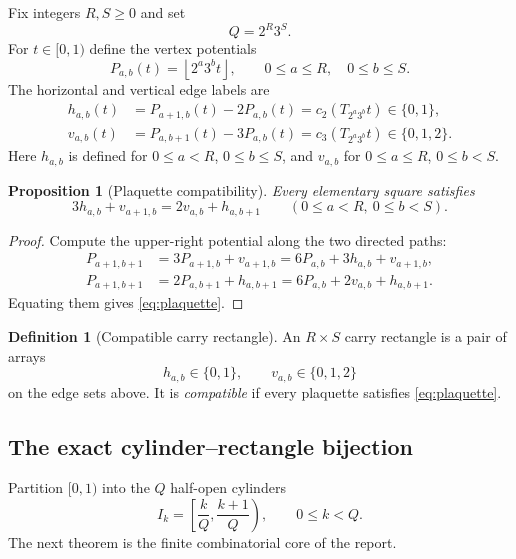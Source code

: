 \documentclass[11pt]{article}
\newtheorem{proposition}[theorem]{Proposition}
\theoremstyle{definition}
\newtheorem{definition}[theorem]{Definition}
\theoremstyle{remark}
\newcommand{\floor}[1]{\left\lfloor#1\right\rfloor}
\begin{document}
Fix integers $R,S\ge0$ and set
\begin{equation}\label{eq:Q-smooth}
 Q=2^R3^S.
\end{equation}
For $t\in[0,1)$ define the vertex potentials
\begin{equation}\label{eq:vertex-potential}
 P_{a,b}(t)=\floor{2^a3^b t},
 \qquad 0\le a\le R,
 \quad 0\le b\le S.
\end{equation}
The horizontal and vertical edge labels are
\begin{align}
 h_{a,b}(t)
 &=P_{a+1,b}(t)-2P_{a,b}(t)
 =c_2(T_{2^a3^b}t)\in\{0,1\},
 \label{eq:h-carry}\\
 v_{a,b}(t)
 &=P_{a,b+1}(t)-3P_{a,b}(t)
 =c_3(T_{2^a3^b}t)\in\{0,1,2\}.
 \label{eq:v-carry}
\end{align}
Here $h_{a,b}$ is defined for $0\le a<R$, $0\le b\le S$, and $v_{a,b}$ for
$0\le a\le R$, $0\le b<S$.

\begin{proposition}[Plaquette compatibility]\label{prop:plaquette}
Every elementary square satisfies
\begin{equation}\label{eq:plaquette}
 3h_{a,b}+v_{a+1,b}=2v_{a,b}+h_{a,b+1}
 \qquad(0\le a<R,\ 0\le b<S).
\end{equation}
\end{proposition}

\begin{proof}
Compute the upper-right potential along the two directed paths:
\begin{align*}
 P_{a+1,b+1}
 &=3P_{a+1,b}+v_{a+1,b}
  =6P_{a,b}+3h_{a,b}+v_{a+1,b},\\
 P_{a+1,b+1}
 &=2P_{a,b+1}+h_{a,b+1}
  =6P_{a,b}+2v_{a,b}+h_{a,b+1}.
\end{align*}
Equating them gives \eqref{eq:plaquette}.
\end{proof}

\begin{definition}[Compatible carry rectangle]\label{def:compatible}
An $R\times S$ carry rectangle is a pair of arrays
\[
 h_{a,b}\in\{0,1\},
 \qquad
 v_{a,b}\in\{0,1,2\}
\]
on the edge sets above.  It is \emph{compatible} if every plaquette satisfies
\eqref{eq:plaquette}.
\end{definition}

\subsection{The exact cylinder--rectangle bijection}

Partition $[0,1)$ into the $Q$ half-open cylinders
\begin{equation}\label{eq:cylinders}
 I_k=\left[\frac{k}{Q},\frac{k+1}{Q}\right),
 \qquad 0\le k<Q.
\end{equation}
The next theorem is the finite combinatorial core of the report.
\end{document}
